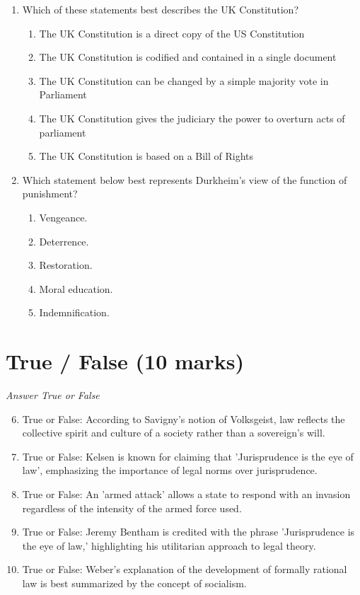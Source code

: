 \documentclass[12pt]{article}
\begin{document}
\begin{enumerate}[label=\arabic*.]
\begin{enumerate}[label=(\alph*)]
\end{enumerate}
\item Which of these statements best describes the UK Constitution?
\begin{enumerate}[label=(\alph*)]
    \item The UK Constitution is a direct copy of the US Constitution
    \item The UK Constitution is codified and contained in a single document
    \item The UK Constitution can be changed by a simple majority vote in Parliament
    \item The UK Constitution gives the judiciary the power to overturn acts of parliament
    \item The UK Constitution is based on a Bill of Rights
\end{enumerate}
\item Which statement below best represents Durkheim's view of the function of punishment?
\begin{enumerate}[label=(\alph*)]
    \item Vengeance.
    \item Deterrence.
    \item Restoration.
    \item Moral education.
    \item Indemnification.
\end{enumerate}
\end{enumerate}

\section*{True / False (10 marks)}
\textit{Answer True or False}
\begin{enumerate}[label=\arabic*.]
\setcounter{enumi}{5}
\item True or False: According to Savigny's notion of Volksgeist, law reflects the collective spirit and culture of a society rather than a sovereign's will.
\item True or False: Kelsen is known for claiming that 'Jurisprudence is the eye of law', emphasizing the importance of legal norms over jurisprudence.
\item True or False: An 'armed attack' allows a state to respond with an invasion regardless of the intensity of the armed force used.
\item True or False: Jeremy Bentham is credited with the phrase 'Jurisprudence is the eye of law,' highlighting his utilitarian approach to legal theory.
\item True or False: Weber's explanation of the development of formally rational law is best summarized by the concept of socialism.
\end{enumerate}
\end{document}
